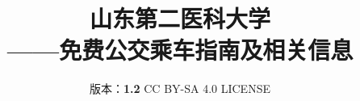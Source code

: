 

\title{%
    \normalsize
    \vspace{120pt}
    {\Huge\textbf{山东第二医科大学\\[5pt]——免费公交乘车指南及相关信息}}
}
\author{%
    版本：\textbf{1.2} \qquad%
    CC BY-SA 4.0 LICENSE \qquad%
    }
\date{\CurrentCustomTime}
\maketitle

\renewcommand{\thefootnote}{\arabic{footnote}}
